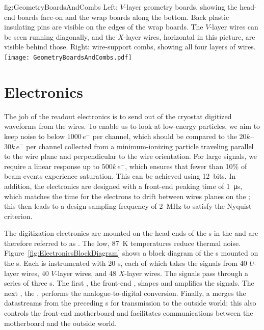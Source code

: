\begin{dunefigure}{fig:GeometryBoardsAndCombs}
{Left: $V$-layer geometry boards, showing the head-end boards face-on and the wrap boards along the bottom. Back plastic insulating pins are visible on the edges of the wrap boards. The $V$-layer wires can be seen running diagonally, and the $X$-layer wires, horizontal in this picture, are visible behind those.  Right: wire-support combs, showing all four layers of wires.}
\texttt{[image: GeometryBoardsAndCombs.pdf]}
\end{dunefigure}


\section{Electronics}
\label{sec:fdsp-exec-electronics}

The job of the readout electronics is to send out of the cryostat digitized waveforms from the  wires. To enable us to look at low-energy particles, we aim to keep noise to below $1000\,e^{-}$ per channel, which should be compared to the $20k$--$30k\,e^{-}$ per channel collected from a minimum-ionizing particle traveling parallel to the wire plane and perpendicular to the wire orientation. For large signals, we require a linear response up to $500k\,e^{-}$, which ensures that fewer than 10\% of beam events experience saturation. This can be achieved using 12\,  bits. In addition, the electronics are designed with a front-end peaking time of \SI{1}{\micro\second}, which matches the time for the electrons to drift between wires planes on the ; this then leads to a design sampling frequency of \SI{2}{\mega\hertz} to satisfy the Nyquist criterion.

The digitization electronics are mounted on the head ends of the s in the  and are therefore referred to as . The low, \SI{87}{\kelvin} temperatures reduce thermal noise. Figure~\ref{fig:ElectronicsBlockDiagram} shows a block diagram of the s mounted on the s. Each  is instrumented with 20 s, each of which takes the signals from 40 $U$-layer wires, 40 $V$-layer wires, and 48 $X$-layer wires. The signals pass through a series of three s. The first , the front-end , shapes and amplifies the signals. The next , the  , performs the analogue-to-digital conversion. Finally, a   merges the datastreams from the preceding s for transmission to the outside world; this   also controls the front-end motherboard and facilitates communications between the motherboard and the outside world.

